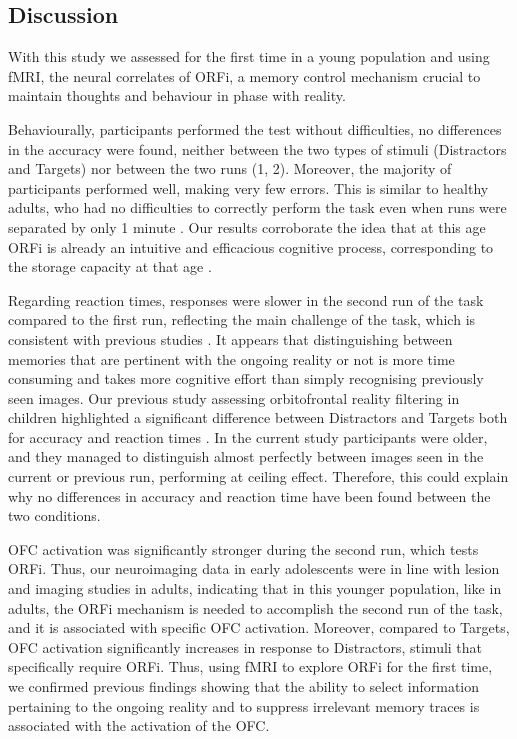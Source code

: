 \subsection{Discussion}
With this study we assessed for the first time in a young population and using fMRI, the neural correlates of ORFi, a memory control mechanism crucial to maintain thoughts and behaviour in phase with reality.

Behaviourally, participants performed the test without difficulties, no differences in the accuracy were found, neither between the two types of stimuli (Distractors and Targets) nor between the two runs (1, 2). Moreover, the majority of participants performed well, making very few errors. This is similar to healthy adults, who had no difficulties to correctly perform the task even when runs were separated by only 1 minute \citep{Schnider1999, Wahlen2011}. Our results corroborate the idea that at this age ORFi is already an intuitive and efficacious cognitive process, corresponding to the storage capacity at that age \citep{Liverani2017}. 

Regarding reaction times, responses were slower in the second run of the task compared to the first run, reflecting the main challenge of the task, which is consistent with previous studies \citep{Bouzerda-Wahlen2015, Liverani2016, Liverani2017}. It appears that distinguishing between memories that are pertinent with the ongoing reality or not is more time consuming and takes more cognitive effort than simply recognising previously seen images. Our previous study assessing orbitofrontal reality filtering in children highlighted a significant difference between Distractors and Targets both for accuracy and reaction times \citep{Liverani2017}. In the current study participants were older, and they managed to distinguish almost perfectly between images seen in the current or previous run, performing at ceiling effect. Therefore, this could explain why no differences in accuracy and reaction time have been found between the two conditions. 

OFC activation was significantly stronger during the second run, which tests ORFi. Thus, our neuroimaging data in early adolescents were in line with lesion and imaging studies in adults, indicating that in this younger population, like in adults, the ORFi mechanism is needed to accomplish the second run of the task, and it is associated with specific OFC activation. Moreover, compared to Targets, OFC activation significantly increases in response to Distractors, stimuli that specifically require ORFi. Thus, using fMRI to explore ORFi for the first time, we confirmed previous findings showing that the ability to select information pertaining to the ongoing reality and to suppress irrelevant memory traces is associated with the activation of the OFC. 

